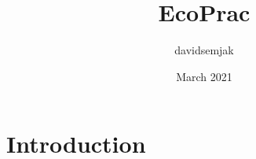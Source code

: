 \documentclass{article}
\title{EcoPrac}
\author{davidsemjak }
\date{March 2021}
\begin{document}
\maketitle

\section{Introduction}
\end{document}
